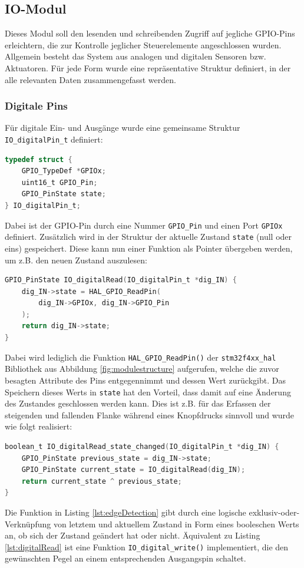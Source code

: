 \subsection{IO-Modul}
Dieses Modul soll den lesenden und schreibenden Zugriff auf jegliche GPIO-Pins erleichtern, die zur Kontrolle jeglicher Steuerelemente angeschlossen wurden. Allgemein besteht das System aus analogen und digitalen Sensoren bzw. Aktuatoren. Für jede Form wurde eine repräsentative Struktur definiert, in der alle relevanten Daten zusammengefasst werden.
\subsubsection{Digitale Pins}
Für digitale Ein- und Ausgänge wurde eine gemeinsame Struktur \verb|IO_digitalPin_t| definiert:
\begin{lstlisting}[language=C, caption={Struktur für digitale Pins}, label={lst:digitalPin}]
typedef struct {
	GPIO_TypeDef *GPIOx;
	uint16_t GPIO_Pin;
	GPIO_PinState state;
} IO_digitalPin_t;
\end{lstlisting}
Dabei ist der GPIO-Pin durch eine Nummer \verb|GPIO_Pin| und einen Port \verb|GPIOx| definiert. Zusätzlich wird in der Struktur der aktuelle Zustand \verb|state| (null oder eins) gespeichert. Diese kann nun einer Funktion als Pointer übergeben werden, um z.B. den neuen Zustand auszulesen:
\begin{lstlisting}[language=C, caption={Einlesen eines digitalen Pin-Zustands}, label={lst:digitalRead}]
GPIO_PinState IO_digitalRead(IO_digitalPin_t *dig_IN) {
	dig_IN->state = HAL_GPIO_ReadPin(
		dig_IN->GPIOx, dig_IN->GPIO_Pin
	);
	return dig_IN->state;
}
\end{lstlisting}
Dabei wird lediglich die Funktion \verb|HAL_GPIO_ReadPin()| der \verb|stm32f4xx_hal| Bibliothek aus Abbildung \ref{fig:modulestructure} aufgerufen, welche die zuvor besagten Attribute des Pins entgegennimmt und dessen Wert zurückgibt. Das Speichern dieses Werts in \verb|state| hat den Vorteil, dass damit auf eine Änderung des Zustandes geschlossen werden kann. Dies ist z.B. für das Erfassen der steigenden und fallenden Flanke während eines Knopfdrucks sinnvoll und wurde wie folgt realisiert:
\begin{lstlisting}[language=C, caption={Detektion einer Flanke}, label={lst:edgeDetection}]
boolean_t IO_digitalRead_state_changed(IO_digitalPin_t *dig_IN) {
	GPIO_PinState previous_state = dig_IN->state;
	GPIO_PinState current_state = IO_digitalRead(dig_IN);
	return current_state ^ previous_state;
}
\end{lstlisting}
Die Funktion in Listing \ref{lst:edgeDetection} gibt durch eine logische exklusiv-oder-Verknüpfung von letztem und aktuellem Zustand in Form eines booleschen Werts an, ob sich der Zustand geändert hat oder nicht. Äquivalent zu Listing \ref{lst:digitalRead} ist eine Funktion \verb|IO_digital_write()| implementiert, die den gewünschten Pegel an einem entsprechenden Ausgangspin schaltet.
